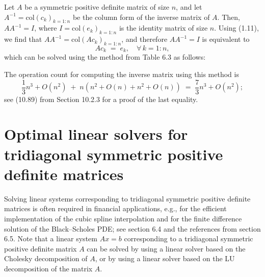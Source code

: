 Let $A$ be a symmetric positive definite matrix of size $n$, and let
$A^{-1} = \text{col}(c_k)_{k=1:n}$ be the column form of the inverse matrix of $A$.
Then, $AA^{-1} = I$, where $I = \text{col}(e_k)_{k=1:n}$ is the identity matrix of size
$n$. Using (1.11), we find that $AA^{-1} = \text{col}(Ac_k)_{k=1:n}$, and therefore
$AA^{-1} = I$ is equivalent to
\[
Ac_k \;=\; e_k, \quad \forall\, k = 1:n,
\]
which can be solved using the method from Table 6.3 as follows:
\begin{center}
\end{center}

The operation count for computing the inverse matrix using this method is
\begin{equation}
\frac{1}{3}n^3 + O(n^2) \;+\; n\left(n^2+O(n) + n^2+O(n)\right) \;=\; \frac{7}{3}n^3 + O(n^2);
\end{equation}
see (10.89) from Section 10.2.3 for a proof of the last equality.


\section{Optimal linear solvers for tridiagonal symmetric positive definite matrices}

Solving linear systems corresponding to tridiagonal symmetric positive definite
matrices is often required in financial applications, e.g., for the efficient
implementation of the cubic spline interpolation and for the finite difference
solution of the Black--Scholes PDE; see section 6.4 and the references from section
6.5. Note that a linear system $Ax = b$ corresponding to a tridiagonal symmetric
positive definite matrix $A$ can be solved by using a linear solver based on the
Cholesky decomposition of $A$, or by using a linear solver based on the LU
decomposition of the matrix $A$.
